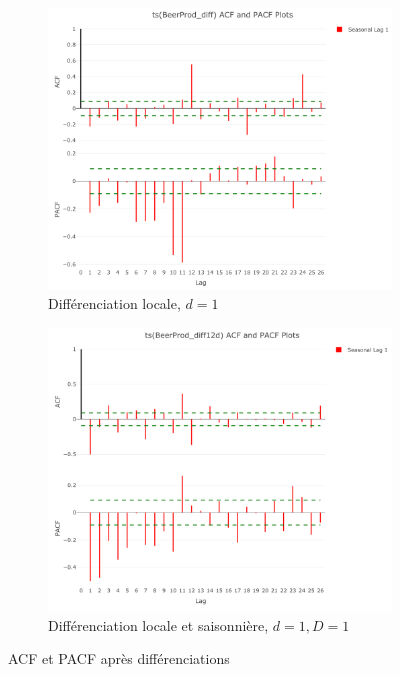 \documentclass[12pt,a4paper]{book}
\newcommand{\1}{\mathds{1}}
\begin{document}
\begin{figure}[h]
\centering
	\begin{subfigure}{.4\textwidth}
    	\includegraphics[width=\textwidth]{d1D0}  
    	\caption{Différenciation locale, $d=1$}
    	\label{fig:sub1}
    \end{subfigure}
    \begin{subfigure}{.4\textwidth}
    	\includegraphics[width=\textwidth]{d1D1}  
    	\caption{Différenciation locale et saisonnière, $d=1, D=1$}
    	\label{fig:sub2}
    \end{subfigure}

\caption{ACF et PACF après différenciations}
\label{fig:2}
   
\end{figure}
\end{document}
